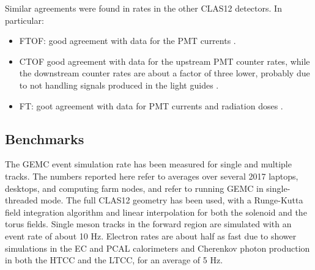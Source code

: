 


Similar agreements were found in rates in the other CLAS12 detectors. In particular:

\begin{itemize}
	\item FTOF: good agreement with data for the PMT currents \cite{ftof2019}.
	\item CTOF good agreement with data for the upstream PMT counter rates, while the downstream counter rates
		  are about a factor of three lower, probably due to not handling signals produced in the light guides \cite{ctof2019}.
	\item FT: goot agreement with data for PMT currents and radiation doses \cite{ft2019}.
\end{itemize}


\subsection{Benchmarks}

The GEMC event simulation rate has been measured for single and multiple tracks. The numbers reported here
refer to averages over several 2017 laptops, desktops, and computing farm nodes, and refer to running GEMC in single-threaded mode.
The full CLAS12 geometry has been used, with a Runge-Kutta field integration algorithm
and linear interpolation for both the solenoid and the torus fields.
Single meson tracks in the forward region are simulated with an event rate of about 10 Hz.
Electron rates are about half as fast due to shower simulations in the EC and PCAL calorimeters and
Cherenkov photon production in both the HTCC and the LTCC, for an average of 5 Hz.

